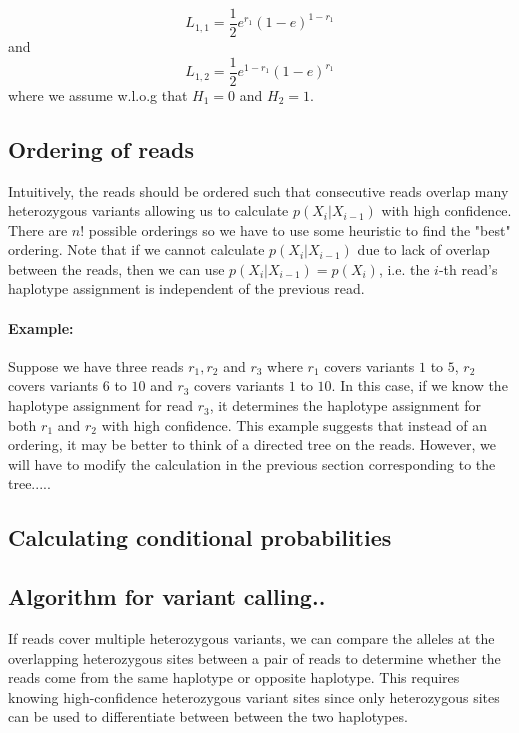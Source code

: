 \documentclass[9pt]{osa-supplemental-document}
\begin{document}
\[ L_{1,1} = \frac{1}{2}e^{r_1}{(1-e)}^{1-r_1}\] and \[L_{1,2} = \frac{1}{2}e^{1-r_1}{(1-e)}^{r_1}\]
where we assume w.l.o.g that $H_1 = 0$ and $H_2=1$. 

\subsection{Ordering of reads}

Intuitively, the reads should be ordered such that consecutive reads overlap many heterozygous variants allowing us to calculate $p(X_i|X_{i-1})$ with high confidence. There are $n!$ possible orderings so we have to use some heuristic to find the "best" ordering.
Note that if we cannot calculate $p(X_i|X_{i-1})$ due to lack of overlap between the reads, then we can use $p(X_i|X_{i-1}) = p(X_i)$, i.e. the $i$-th read's haplotype assignment is independent of the previous read. 

\paragraph{Example:}
Suppose we have three reads $r_1, r_2$ and $r_3$ where $r_1$ covers variants $1$ to $5$, $r_2$ covers variants $6$ to $10$ and $r_3$ covers variants $1$ to $10$. In this case, if we know the haplotype assignment for read $r_3$, it determines the haplotype assignment for both $r_1$ and $r_2$ with high confidence. This example suggests that instead of an ordering, it may be better to think of a directed tree on the reads. However, we will have to modify the calculation in the previous section corresponding to the tree.....


\subsection{Calculating conditional probabilities}


\subsection{Algorithm for variant calling..}

If reads cover multiple heterozygous variants, we can compare the alleles at the overlapping heterozygous sites between a pair of reads to determine whether the reads come from the same haplotype or opposite haplotype. This requires knowing high-confidence heterozygous variant sites since only heterozygous sites can be used to differentiate between between the two haplotypes. 
\end{document}
